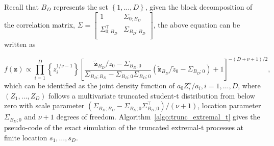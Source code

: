 \documentclass[lineno]{biometrika}
\begin{document}
Recall that $B_D$ represents the set $\left\{ 1, \ldots, D\right\}$, given the block decomposition of the correlation matrix, $\Sigma = \begin{bmatrix}
	1 & \Sigma_{0;B_D} \\
	\Sigma_{0;B_D}^\top & \Sigma_{B_D;B_D} \\
\end{bmatrix}$, 
the above equation can be written as

\begin{equation*}
    f(\bm z) \propto \prod_{i=1}^D \left\{z_i^{1/\nu-1}\right\} 
    \left[ \frac{\tilde{\bm z}_{B_D}/\tilde{z}_0 - \Sigma_{B_D;0}}{\Sigma_{B_D;B_D} - \Sigma_{B_D;0}\Sigma_{B_D;0}}
    \left(\tilde{\bm z}_{B_D}/\tilde{z}_0 - \Sigma_{B_D;0}\right) + 1 \right]^{-(D+\nu+1)/2},    
\end{equation*}
which can be identified as the joint density function of $a_0 Z_i^\nu/a_i,i=1,\dots,D$, where $(Z_1,\dots,Z_D)$ follows a multivariate truncated student-t distribution from below zero with scale parameter $(\Sigma_{B_D;B_D} - \Sigma_{B_D;0} \Sigma_{B_D;0}^\top) / (\nu+1)$, location parameter $\Sigma_{B_D;0}$ and $\nu+1$ degrees of freedom. Algorithm~\ref{algo:trunc_extremal_t} gives the pseudo-code of the exact simulation of the truncated extremal-t processes at finite location $s_1,\dots,s_D$.
\end{document}
